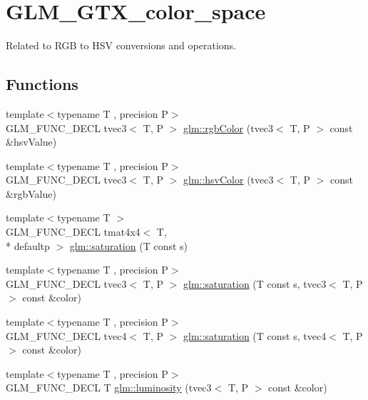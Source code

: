 \hypertarget{group__gtx__color__space}{\section{G\-L\-M\-\_\-\-G\-T\-X\-\_\-color\-\_\-space}
\label{group__gtx__color__space}
}


Related to R\-G\-B to H\-S\-V conversions and operations.  


\subsection*{Functions}
\begin{DoxyCompactItemize}
\item 
{\footnotesize template$<$typename T , precision P$>$ }\\G\-L\-M\-\_\-\-F\-U\-N\-C\-\_\-\-D\-E\-C\-L tvec3$<$ T, P $>$ \hyperlink{group__gtx__color__space_ga36b0619e31daf57bc4a54dac2dcf34b7}{glm\-::rgb\-Color} (tvec3$<$ T, P $>$ const \&hsv\-Value)
\item 
{\footnotesize template$<$typename T , precision P$>$ }\\G\-L\-M\-\_\-\-F\-U\-N\-C\-\_\-\-D\-E\-C\-L tvec3$<$ T, P $>$ \hyperlink{group__gtx__color__space_gae72039c00a7be2f03a3b94b37a54349a}{glm\-::hsv\-Color} (tvec3$<$ T, P $>$ const \&rgb\-Value)
\item 
{\footnotesize template$<$typename T $>$ }\\G\-L\-M\-\_\-\-F\-U\-N\-C\-\_\-\-D\-E\-C\-L tmat4x4$<$ T, \\*
defaultp $>$ \hyperlink{group__gtx__color__space_gafecfb15d58da8445103745af3348e516}{glm\-::saturation} (T const s)
\item 
{\footnotesize template$<$typename T , precision P$>$ }\\G\-L\-M\-\_\-\-F\-U\-N\-C\-\_\-\-D\-E\-C\-L tvec3$<$ T, P $>$ \hyperlink{group__gtx__color__space_ga632ee8dadb44e90a05885f6f8c07d46c}{glm\-::saturation} (T const s, tvec3$<$ T, P $>$ const \&color)
\item 
{\footnotesize template$<$typename T , precision P$>$ }\\G\-L\-M\-\_\-\-F\-U\-N\-C\-\_\-\-D\-E\-C\-L tvec4$<$ T, P $>$ \hyperlink{group__gtx__color__space_ga2033e0566c595230714af396744e8a61}{glm\-::saturation} (T const s, tvec4$<$ T, P $>$ const \&color)
\item 
{\footnotesize template$<$typename T , precision P$>$ }\\G\-L\-M\-\_\-\-F\-U\-N\-C\-\_\-\-D\-E\-C\-L T \hyperlink{group__gtx__color__space_gaa2f38a5100c3e1c7d39920df43bd8cbe}{glm\-::luminosity} (tvec3$<$ T, P $>$ const \&color)
\end{DoxyCompactItemize}


